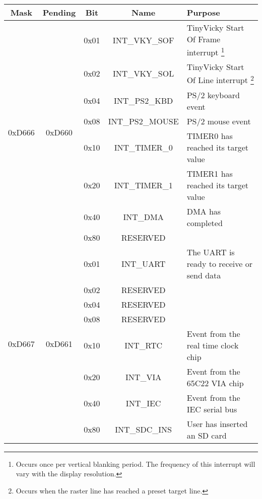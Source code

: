 \begin{table}
	\begin{center}
		\begin{tabular}{| c | c | c | c | l |} \hline
            Mask & Pending & Bit & Name & Purpose \\ \hline\hline
			
            \multirow{8}{*}{0xD666} & \multirow{8}{*}{0xD660} & 0x01 & INT\_VKY\_SOF & TinyVicky Start Of Frame interrupt
			\footnote{Occurs once per vertical blanking period. The frequency of this interrupt will vary with the display resolution.} \\ \cline{3-5}

            & & 0x02 & INT\_VKY\_SOL & TinyVicky Start Of Line interrupt
			\footnote{Occurs when the raster line has reached a preset target line.} \\ \cline{3-5}

            & & 0x04 & INT\_PS2\_KBD & PS/2 keyboard event \\ \cline{3-5}

            & & 0x08 & INT\_PS2\_MOUSE & PS/2 mouse event \\ \cline{3-5}

            & & 0x10 & INT\_TIMER\_0 & TIMER0 has reached its target value \\ \cline{3-5}

            & & 0x20 & INT\_TIMER\_1 & TIMER1 has reached its target value \\ \cline{3-5}

            & & 0x40 & INT\_DMA & DMA has completed \\ \cline{3-5}

            & & 0x80 & RESERVED & \\ \hline

            \multirow{8}{*}{0xD667} & \multirow{8}{*}{0xD661} & 0x01 & INT\_UART & The UART is ready to receive or send data \\ \cline{3-5}

            & & 0x02 & RESERVED & \\ \cline{3-5}

            & & 0x04 & RESERVED & \\ \cline{3-5}

            & & 0x08 & RESERVED & \\ \cline{3-5}

            & & 0x10 & INT\_RTC & Event from the real time clock chip \\ \cline{3-5}

            & & 0x20 & INT\_VIA & Event from the 65C22 VIA chip \\ \cline{3-5}

            & & 0x40 & INT\_IEC & Event from the IEC serial bus \\ \cline{3-5}

            & & 0x80 & INT\_SDC\_INS & User has inserted an SD card \\ \hline
        \end{tabular}
    \end{center}
\end{table}

